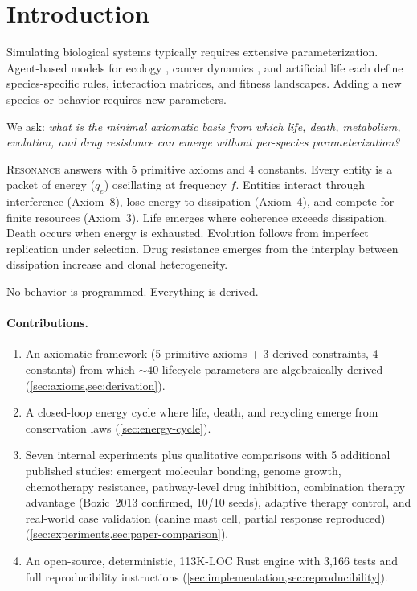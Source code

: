 \documentclass[11pt,a4paper]{article}
\begin{document}
\section{Introduction}
\label{sec:intro}

Simulating biological systems typically requires extensive
parameterization. Agent-based models for ecology
\citep{grimm2005individual}, cancer dynamics
\citep{bozic2013evolutionary}, and artificial life
\citep{langton1997artificial} each define species-specific
rules, interaction matrices, and fitness landscapes.
Adding a new species or behavior requires new parameters.

We ask: \emph{what is the minimal axiomatic basis from which
life, death, metabolism, evolution, and drug resistance
can emerge without per-species parameterization?}

\textsc{Resonance} answers with 5 primitive axioms and 4 constants.
Every entity is a packet of energy ($q_e$) oscillating at
frequency $f$. Entities interact through interference
(Axiom~8), lose energy to dissipation (Axiom~4),
and compete for finite resources (Axiom~3).
Life emerges where coherence exceeds dissipation.
Death occurs when energy is exhausted.
Evolution follows from imperfect replication under selection.
Drug resistance emerges from the interplay between
dissipation increase and clonal heterogeneity.

No behavior is programmed. Everything is derived.

\paragraph{Contributions.}
\begin{enumerate}
  \item An axiomatic framework (5 primitive axioms + 3 derived
        constraints, 4 constants) from which
        ${\sim}40$ lifecycle parameters are algebraically derived
        (\cref{sec:axioms,sec:derivation}).
  \item A closed-loop energy cycle where life, death, and
        recycling emerge from conservation laws
        (\cref{sec:energy-cycle}).
  \item Seven internal experiments plus qualitative comparisons
        with 5 additional published studies: emergent molecular bonding,
        genome growth, chemotherapy resistance, pathway-level
        drug inhibition, combination therapy advantage
        (Bozic~2013 confirmed, 10/10 seeds), adaptive
        therapy control, and real-world case validation
        (canine mast cell, partial response reproduced)
        (\cref{sec:experiments,sec:paper-comparison}).
  \item An open-source, deterministic, 113K-LOC Rust engine
        with 3{,}166 tests and full reproducibility instructions
        (\cref{sec:implementation,sec:reproducibility}).
\end{enumerate}
\end{document}
